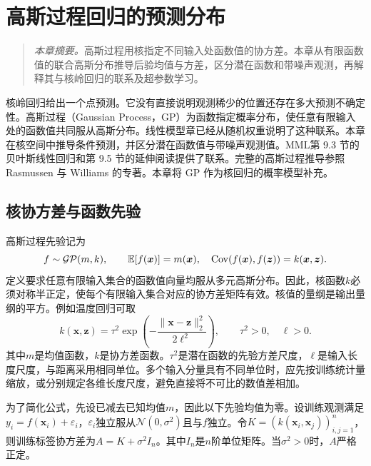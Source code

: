 \chapter{高斯过程回归的预测分布}
\label{chap:kernel-gp}
\begin{quote}\small
\textit{本章摘要。}高斯过程用核指定不同输入处函数值的协方差。本章从有限函数值的联合高斯分布推导后验均值与方差，区分潜在函数和带噪声观测，再解释其与核岭回归的联系及超参数学习。
\end{quote}

核岭回归给出一个点预测。它没有直接说明观测稀少的位置还存在多大预测不确定性。高斯过程（Gaussian Process，GP）为函数指定概率分布，使任意有限输入处的函数值共同服从高斯分布。线性模型章已经从随机权重说明了这种联系。本章在核空间中推导条件预测，并区分潜在函数值与带噪声观测值。MML第 9.3 节的贝叶斯线性回归和第 9.5 节的延伸阅读提供了联系\cite{deisenroth2020mml}。完整的高斯过程推导参照 Rasmussen 与 Williams 的专著\cite{rasmussen2006gpml}。本章将 GP 作为核回归的概率模型补充。

\section{核协方差与函数先验}
高斯过程先验记为
\begin{equation}
 f\sim\mathcal{GP}(m,k),\qquad
 \mathbb{E}[f(\bm x)]=m(\bm x),\quad
 \operatorname{Cov}(f(\bm x),f(\bm z))=k(\bm x,\bm z).
\end{equation}
定义要求任意有限输入集合的函数值向量均服从多元高斯分布。因此，核函数$k$必须对称半正定，使每个有限输入集合对应的协方差矩阵有效。核值的量纲是输出量纲的平方。例如温度回归可取
\[
 k(\bm x,\bm z)=\tau^2\exp\left(-\frac{\|\bm x-\bm z\|_2^2}{2\ell^2}\right),
 \qquad \tau^2>0,\quad\ell>0.
\]
其中$m$是均值函数，$k$是协方差函数。$\tau^2$是潜在函数的先验方差尺度，$\ell$是输入长度尺度，与距离采用相同单位。多个输入分量具有不同单位时，应先按训练统计量缩放，或分别规定各维长度尺度，避免直接将不可比的数值差相加。

为了简化公式，先设已减去已知均值$m$，因此以下先验均值为零。设训练观测满足$y_i=f(\bm x_i)+\varepsilon_i$，$\varepsilon_i$独立服从$\mathcal N(0,\sigma^2)$且与$f$独立。令$K=(k(\bm x_i,\bm x_j))_{i,j=1}^n$，则训练标签协方差为$A=K+\sigma^2I_n$。其中$I_n$是$n$阶单位矩阵。当$\sigma^2>0$时，$A$严格正定。

